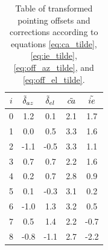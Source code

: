 \begin{table}[H]
    \centering
    \caption{Table of transformed pointing offsets and corrections according to equations \eqref{eq:ca_tilde}, \eqref{eq:ie_tilde}, \eqref{eq:off_az_tilde}, and \eqref{eq:off_el_tilde}.}
    \label{tab:tranform_offsets}
\begin{tabular}{ccccc}
\toprule
$i$ & $\Tilde{\delta}_{az}$ &  $\Tilde{\delta}_{el}$ &  $\Tilde{ca}$ &  $\Tilde{ie}$ \\
\midrule
0 &       1.2 &       0.1 &       2.1 &       1.7 \\
1 &       0.0 &       0.5 &       3.3 &       1.6 \\
2 &      -1.1 &      -0.5 &       3.3 &       1.1 \\
3 &       0.7 &       0.7 &       2.2 &       1.6 \\
4 &       0.2 &       0.7 &       2.8 &       0.9 \\
5 &       0.1 &      -0.3 &       3.1 &       0.2 \\
6 &      -1.0 &       1.3 &       3.2 &       0.5 \\
7 &       0.5 &       1.4 &       2.2 &      -0.7 \\
8 &      -0.8 &      -1.1 &       2.7 &      -2.2 \\
\bottomrule
\end{tabular}

\end{table}